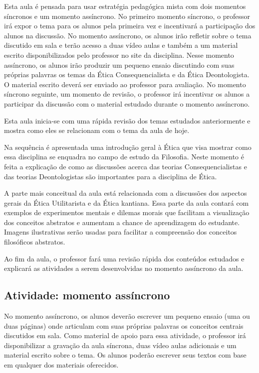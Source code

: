 \documentclass[
	article,			%
	12pt,				%
	twoside,			%
	a4paper,			%
	english,			%
	brazil,				%
	sumario=tradicional
]{plano}
\begin{document}
Esta aula é pensada para usar estratégia pedagógica mista com dois momentos síncronos e um momento assíncrono. No primeiro momento síncrono, o professor irá expor o tema para os alunos pela primeira vez e incentivará a participação dos alunos na discussão. No momento assíncrono, os alunos irão refletir sobre o tema discutido em sala e terão acesso a duas vídeo aulas e também a um material escrito disponibilizados pelo professor no site da disciplina. Nesse momento assíncrono, os alunos irão produzir um pequeno ensaio discutindo com suas próprias palavras os temas da Ética Consequencialista e da Ética Deontologista. O material escrito deverá ser enviado ao professor para avaliação. No momento síncrono seguinte, um momento de revisão, o professor irá incentivar os alunos a participar da discussão com o material estudado durante o momento assíncrono.

Esta aula inicia-se com uma rápida revisão dos temas estudados anteriormente e mostra como eles se relacionam com o tema da aula de hoje.

Na sequência é apresentada uma introdução geral à Ética que visa mostrar como essa disciplina se enquadra no campo de estudo da Filosofia. Neste momento é feita a explicação de como as discussões acerca das teorias Consequencialistas e das teorias Deontologistas são importantes para a disciplina de Ética.

A parte mais conceitual da aula está relacionada com a discussões dos aspectos gerais da Ética Utilitarista e da Ética kantiana. Essa parte da aula contará com exemplos de experimentos mentais e dilemas morais que facilitam a visualização dos conceitos abstratos e aumentam a chance de aprendizagem do estudante. Imagens ilustrativas serão usadas para facilitar a compreensão dos conceitos filosóficos abstratos.

Ao fim da aula, o professor fará uma revisão rápida dos conteúdos estudados e explicará as atividades a serem desenvolvidas no momento assíncrono da aula.

\begin{snugshade}
	\section{Atividade: momento assíncrono} %
\end{snugshade}

No momento assíncrono, os alunos deverão escrever um pequeno ensaio (uma ou duas páginas) onde articulam com suas próprias palavras os conceitos centrais discutidos em sala. Como material de apoio para essa atividade, o professor irá disponibilizar a gravação da aula síncrona, duas vídeo aulas adicionais e um material escrito sobre o tema. Os alunos poderão escrever seus textos com base em qualquer dos materiais oferecidos.
\end{document}
